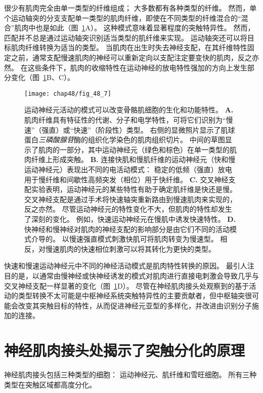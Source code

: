 很少有肌肉完全由单一类型的纤维组成； 大多数都有各种类型的纤维。
然而，单个运动轴突的分支支配单一类型的肌肉纤维，即使在不同类型的纤维混合的“混合”肌肉中也是如此（图~\ref{fig:48_7}A）。
这种模式意味着显著程度的突触特异性。
然而，匹配并不总是通过运动轴突识别适当类型的肌纤维来实现。
运动轴突还可以将目标肌肉纤维转换为适当的类型。
当肌肉在出生时失去神经支配，在其纤维特性固定之前，通常支配慢速肌肉的神经可以重新定向以支配注定要变快的肌肉，反之亦然。
在这些条件下，肌肉的收缩特性在运动神经的放电特性强加的方向上发生部分变化（图~\ref{fig:48_7}B、C）。


\begin{figure}[htbp]
	\centering
	\texttt{[image: chap48/fig\_48\_7]}
	\caption{运动神经元活动的模式可以改变骨骼肌细胞的生化和功能特性。
		\textbf{A.} 肌肉纤维具有特征性的代谢、分子和电学特性，可将它们识别为“慢速”（强直）或“快速”（阶段性）类型。
		右侧的显微照片显示了肌球蛋白\textit{三磷酸腺苷}酶的组织化学染色的肌肉组织切片。
		中间的草图显示了肌肉的一部分，其中运动神经元（绿色和棕色）在单一类型的肌肉纤维上形成突触。
		\textbf{B.} 连接快肌和慢肌纤维的运动神经元（快和慢运动神经元）表现出不同的电活动模式：
		稳定的低频（强直）放电 用于慢纤维和间歇性高频突发（相位）用于快纤维。
		\textbf{C.} 交叉神经支配实验表明，运动神经元的某些特性有助于确定肌纤维是快还是慢。
		交叉神经支配是通过手术将快速轴突重新路由到慢速肌肉来实现的，反之亦然。
		尽管运动神经元的特性变化不大，但肌肉的特性却发生了深刻的变化。
		例如，快速运动神经元在慢肌中诱发快速特性\cite{salmons1976significance}。
		\textbf{D.} 快神经和慢神经对肌肉的神经支配的影响部分是由它们不同的活动模式介导的。
		以慢速强直模式刺激快肌可将肌肉转变为慢速型。
		相反，对慢速肌肉的快速相位刺激可以将其转化为更快的类型。}
	\label{fig:48_7}
\end{figure}


快速和慢速运动神经元中不同的神经活动模式是肌肉特性转换的原因。
最引人注目的是，以通常由慢神经或快神经诱发的模式对肌肉进行直接电刺激会导致几乎与交叉神经支配一样显著的变化（图~\ref{fig:48_7}D）。
尽管在神经肌肉接头处观察到的基于活动的类型转换不太可能是中枢神经系统突触特异性的主要贡献者，但中枢轴突很可能会改变其突触目标的特性，从而促进神经元亚型的多样化，并改进由识别分子施加的连接。



\section{神经肌肉接头处揭示了突触分化的原理}

神经肌肉接头包括三种类型的细胞：
运动神经元、肌纤维和雪旺细胞。
所有三种类型在突触区域都高度分化。


